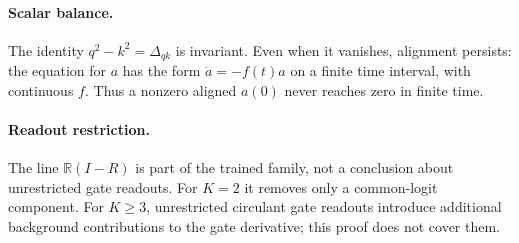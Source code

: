 \paragraph{Scalar balance.}\label{rem:J-balance}
The identity $q^2-k^2=\Delta_{qk}$ is invariant. Even when it vanishes,
alignment persists: the equation for $a$ has the form $\dot a=-f(t)a$
on a finite time interval, with continuous $f$. Thus a nonzero aligned
$a(0)$ never reaches zero in finite time.
\paragraph{Readout restriction.}\label{rem:J-line}
The line $\mathbb R(I-R)$ is part of the trained family, not a conclusion
about unrestricted gate readouts. For $K=2$ it removes only a common-logit
component. For $K\ge3$, unrestricted circulant gate readouts introduce
additional background contributions to the gate derivative; this proof does
not cover them.

